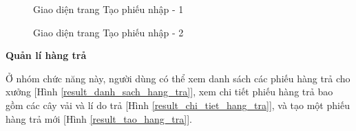 \begin{figure}[H]
    \begin{center}
        \caption{Giao diện trang Tạo phiếu nhập - 1}
        \label{result_tao_phieu_nhap_1}
    \end{center}
\end{figure}

\begin{figure}[H]
    \begin{center}
        \caption{Giao diện trang Tạo phiếu nhập - 2}
        \label{result_tao_phieu_nhap_2}
    \end{center}
\end{figure}

\textbf{Quản lí hàng trả}

Ở nhóm chức năng này, người dùng có thể xem danh sách các phiếu hàng trả cho xưởng [Hình \ref{result_danh_sach_hang_tra}], xem chi tiết phiếu hàng trả bao gồm các cây vải và lí do trả [Hình \ref{result_chi_tiet_hang_tra}], và tạo một phiếu hàng trả mới [Hình \ref{result_tao_hang_tra}].

